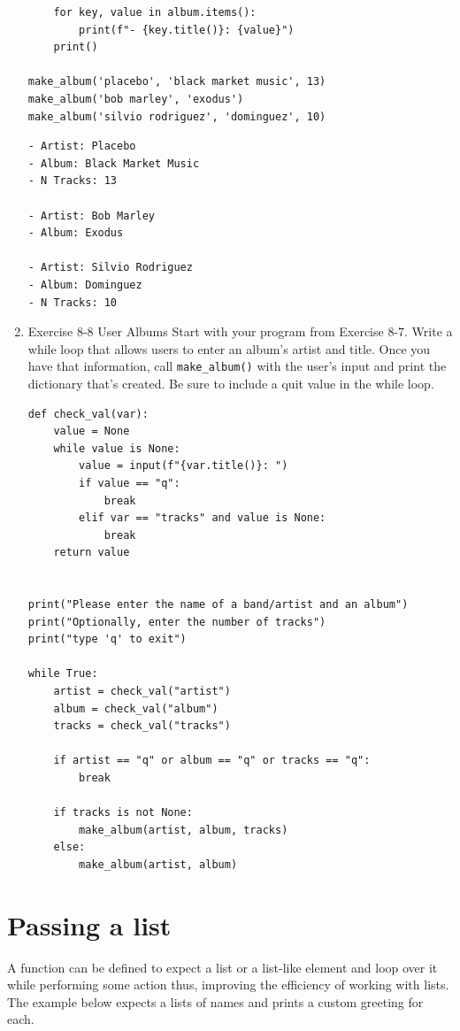 \documentclass[10pt]{book}
\begin{document}
\begin{enumerate}
\begin{verbatim}
    for key, value in album.items():
        print(f"- {key.title()}: {value}")
    print()

make_album('placebo', 'black market music', 13)
make_album('bob marley', 'exodus')
make_album('silvio rodriguez', 'dominguez', 10)
\end{verbatim}

\label{org61e80a8}
\begin{verbatim}
- Artist: Placebo
- Album: Black Market Music
- N Tracks: 13

- Artist: Bob Marley
- Album: Exodus

- Artist: Silvio Rodriguez
- Album: Dominguez
- N Tracks: 10
\end{verbatim}
\item Exercise 8-8 User Albums
\label{sec:org84426fe}
Start with your program from Exercise 8-7. Write a while loop that allows users to enter an album’s artist and title. Once you have that information, call \texttt{make\_album()} with the user’s input and print the dictionary that’s created. Be sure to include a quit value in the while loop.
\begin{verbatim}
def check_val(var):
    value = None
    while value is None:
        value = input(f"{var.title()}: ")
        if value == "q":
            break
        elif var == "tracks" and value is None:
            break
    return value


print("Please enter the name of a band/artist and an album")
print("Optionally, enter the number of tracks")
print("type 'q' to exit")

while True:
    artist = check_val("artist")
    album = check_val("album")
    tracks = check_val("tracks")

    if artist == "q" or album == "q" or tracks == "q":
        break

    if tracks is not None:
        make_album(artist, album, tracks)
    else:
        make_album(artist, album)
\end{verbatim}
\end{enumerate}
\section{Passing a list}
\label{sec:org3fc045a}
A function can be defined to expect a list or a list-like element and loop over it while performing some action thus,  improving the efficiency of working with lists. The example below expects a lists of names and prints a custom greeting for each.
\end{document}
